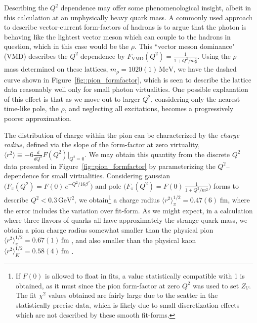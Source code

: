 \documentclass[twocolumn,amsmath,amssymb,prd,10pt,floatfix, 
superscriptaddress,nofootinbib, showpacs, preprintnumbers]{revtex4-1}
\begin{document}
Describing the $Q^2$ dependence may offer some phenomenological insight, albeit in this calculation at an unphysically heavy quark mass. A commonly used approach to describe vector-current form-factors of hadrons is to argue that the photon is behaving like the lightest vector meson which can couple to the hadrons in question, which in this case would be the $\rho$. This ``vector meson dominance"(VMD) describes the $Q^2$ dependence by ${F_{\mathrm{VMD}}(Q^2) = \frac{1}{1 + Q^2/m_\rho^2 }}$. Using the $\rho$ mass determined on these lattices, $m_\rho = 1020(1)\, \mathrm{MeV}$, we have the dashed curve shown in Figure~\ref{fig::pion_formfactor}, which is seen to describe the lattice data reasonably well only for small photon virtualities. One possible explanation of this effect is that as we move out to larger $Q^2$, considering only the nearest time-like pole, the $\rho$, and neglecting all excitations, becomes a progressively poorer approximation.

 
The distribution of charge within the pion can be characterized by the \emph{charge radius}, defined via the slope of the form-factor at zero virtuality, ${\langle r^2 \rangle \equiv -6 \frac{d}{dQ^2}F(Q^2) \big|_{Q^2=0}}$. We may obtain this quantity from the discrete $Q^2$ data presented in Figure~\ref{fig::pion_formfactor} by parameterizing the $Q^2$--dependence for small virtualities. Considering gaussian ${ \big(  F_\pi(Q^2) = F(0)\, e^{-Q^2/16\beta^2}  \big) }$ and pole ${ \big(  F_\pi(Q^2) = F(0)\, \tfrac{1}{1 + Q^2/m^2} \big) }$ forms to describe ${Q^2 < 0.3\,\mathrm{GeV}^2}$, we obtain\footnote{If $F(0)$ is allowed to float in fits, a value statistically compatible with 1 is obtained, as it must since the pion form-factor at zero $Q^2$ was used to set $Z_V$. The fit $\chi^2$ values obtained are fairly large due to the scatter in the statistically precise data, which is likely due to small discretization effects which are not described by these smooth fit-forms.} 
a charge radius ${  \langle r^2 \rangle_{\pi}^{1/2} = 0.47(6) \; \mathrm{fm}  }$, where the error includes the variation over fit-form. As we might expect, in a calculation where three flavors of quarks all have approximately the strange quark mass, we obtain a pion charge radius somewhat smaller than the physical pion ${\langle r^2 \rangle_\pi^{1/2} = 0.67(1)\,\mathrm{fm}}$ \cite{Amendolia:1986wj, PDG-2012}, and also smaller than the physical kaon ${  \langle r^2 \rangle_K^{1/2} = 0.58(4) \, \mathrm{fm}  }$ \cite{Amendolia:1986ui}.
\end{document}
